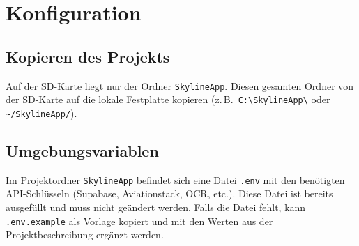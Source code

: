 \section{Konfiguration}
\subsection{Kopieren des Projekts}
Auf der SD-Karte liegt nur der Ordner \texttt{SkylineApp}. Diesen gesamten Ordner von der SD-Karte auf die lokale Festplatte kopieren (z.\,B.\ \texttt{C:\textbackslash{}SkylineApp\textbackslash{}} oder \texttt{\textasciitilde{}/SkylineApp/}).

\subsection{Umgebungsvariablen}
Im Projektordner \texttt{SkylineApp} befindet sich eine Datei \texttt{.env} mit den benötigten API-Schlüsseln (Supabase, Aviationstack, OCR, etc.). Diese Datei ist bereits ausgefüllt und muss nicht geändert werden.
Falls die Datei fehlt, kann \texttt{.env.example} als Vorlage kopiert und mit den Werten aus der Projektbeschreibung ergänzt werden.
